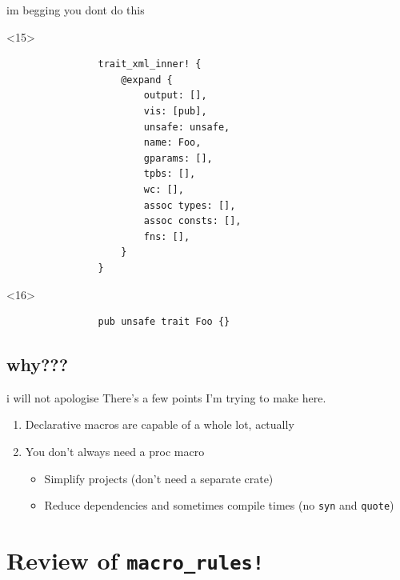 \documentclass{beamer}
\begin{document}
\begin{frame}[fragile]{im begging you dont do this}
		\begin{onlyenv}<15>
			\begin{verbatim}
				trait_xml_inner! {
					@expand {
						output: [],
						vis: [pub],
						unsafe: unsafe,
						name: Foo,
						gparams: [],
						tpbs: [],
						wc: [],
						assoc types: [],
						assoc consts: [],
						fns: [],
					}
				}
			\end{verbatim}
		\end{onlyenv}

		\pause

		\begin{onlyenv}<16>
			\begin{verbatim}
				pub unsafe trait Foo {}
			\end{verbatim}
		\end{onlyenv}
	\end{frame}

	\subsection{why???}
	\begin{frame}{i will not apologise}
		There's a few points I'm trying to make here.

		\pause

		\begin{enumerate}
			\item Declarative macros are capable of a whole lot, actually

			\pause

			\item You don't always need a proc macro
			\begin{itemize}
				\item Simplify projects (don't need a separate crate)
				\item Reduce dependencies and sometimes compile times (no \texttt{syn} and
					\texttt{quote})
			\end{itemize}
		\end{enumerate}
	\end{frame}

	\section[Review of macro\_rules!]{Review of {\color{macrorulescolor}\texttt{macro\_rules!}}}
\end{document}
